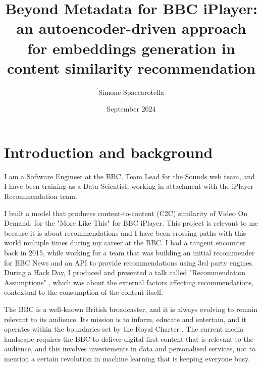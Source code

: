 \documentclass[12pt,a4paper]{article}
\begin{document}
\title{Beyond Metadata for BBC iPlayer:\\an autoencoder-driven approach for embeddings generation in content similarity recommendation}
\author{Simone Spaccarotella}
\date{September 2024}

\maketitle
\tableofcontents

\section{Introduction and background}


I am a Software Engineer at the BBC, Team Lead for the Sounds web team, and I have been training as a Data Scientist,
working in attachment with the iPlayer Recommendation team.

I built a model that produces content-to-content (C2C) similarity of Video On Demand, for the "More Like This" \cite{MoreLikeBluey} for BBC iPlayer.
This project is relevant to me because it is about recommendations and I have been crossing paths with this world multiple times during my career at the BBC.
I had a tangent encounter back in 2015, while working for a team that was building
an initial recommender for BBC News and an API to provide recommendations using 3rd party engines.
During a Hack Day, I produced and presented a talk called
"Recommendation Assumptions" \cite{RecsAssumptions}, which was about the external factors affecting recommendations, contextual to the consumption
of the content itself.

The BBC is a well-known British broadcaster, and it is always evolving to remain relevant to its audience. Its mission
is to inform, educate and entertain, and it operates within the boundaries set by the Royal Charter \cite{RoyalCharterBBC}.
The current media landscape requires the BBC to deliver digital-first content that is relevant to the audience,
and this involves investements in data and personalised services, not to mention a certain revolution in machine learning
that is keeping everyone busy.
\end{document}
